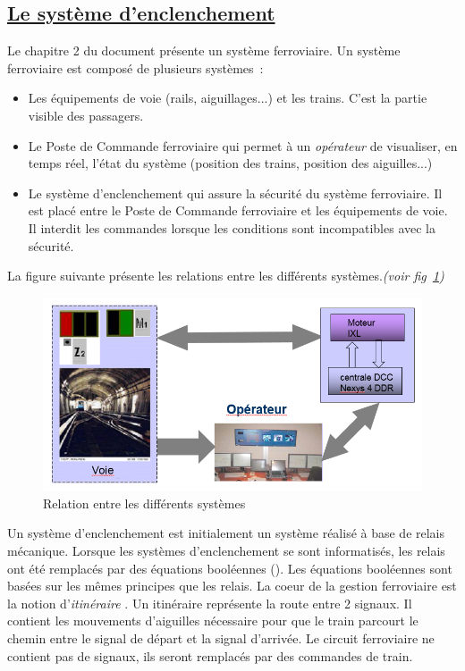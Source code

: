 \subsection{\underline{Le système d'enclenchement}}
\label{sec:log_ixl}

Le chapitre 2 du document \cite{sun2015} présente un système
ferroviaire. Un système ferroviaire est compos\'e de plusieurs systèmes~:
\begin{itemize}
  \item Les \'equipements de voie (rails, aiguillages...) et les
    trains. C'est la partie visible des passagers. 
  \item Le Poste de Commande ferroviaire qui permet à un \emph{op\'erateur} de
    visualiser, en temps r\'eel, l'\'etat du système (position des trains,
    position des aiguilles...)
  \item Le système d'enclenchement qui assure la s\'ecurit\'e du système
    ferroviaire. Il est plac\'e entre le Poste de Commande ferroviaire
    et les \'equipements de voie. Il interdit les commandes lorsque les
    conditions sont incompatibles avec la s\'ecurit\'e. 
\end{itemize}

La figure suivante pr\'esente les relations entre les diff\'erents
systèmes.\emph{(voir fig~\ref{fig3})}

\begin{figure}[h]
\centering
\includegraphics[scale=0.30]{sys_ferro.png}
\caption{Relation entre les différents systèmes}
\label{fig3}
\end{figure}

Un système d'enclenchement est initialement un système réalisé à base
de relais mécanique. Lorsque les systèmes d'enclenchement se sont
informatisés, les relais ont été remplacés par des équations
booléennes (\cite{nyct2016}). Les équations booléennes sont basées sur
  les mêmes principes que les relais. La coeur de la gestion
  ferroviaire est la notion d'\emph{itinéraire} \cite{siteferro}. Un itinéraire
  représente la route entre 2 signaux. Il contient les mouvements
  d'aiguilles nécessaire pour que le train parcourt le chemin entre le
  signal de départ et la signal d'arrivée. Le circuit ferroviaire ne
  contient pas de signaux, ils seront remplacés par des commandes de
  train. 
  
